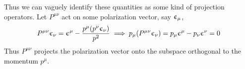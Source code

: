 Thus we can vaguely identify these quantities as some kind of projection operators. Let $P^{\mu\nu}$ act on some polarization vector, say $\upepsilon_\mu$,
$$P^{\mu\nu}\upepsilon_\nu = \upepsilon^\mu -\frac{p^\mu(p^\nu \upepsilon_\nu)}{p^2}\implies p_\mu (P^{\mu\nu}\upepsilon_\nu) = p_\mu \upepsilon^\mu -p_\nu \upepsilon^\nu =0$$
Thus $P^{\mu\nu}$ projects the polarization vector onto the subspace orthogonal to the momentum $p^\mu$. 
